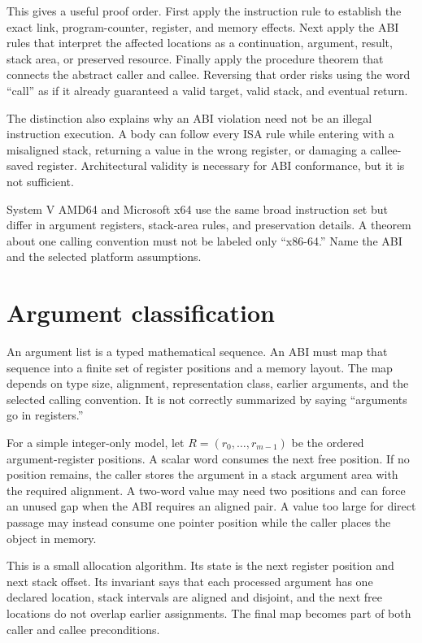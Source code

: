 This gives a useful proof order. First apply the instruction rule to establish
the exact link, program-counter, register, and memory effects. Next apply the
ABI rules that interpret the affected locations as a continuation, argument,
result, stack area, or preserved resource. Finally apply the procedure theorem
that connects the abstract caller and callee. Reversing that order risks using
the word ``call'' as if it already guaranteed a valid target, valid stack, and
eventual return.

The distinction also explains why an ABI violation need not be an illegal
instruction execution. A body can follow every ISA rule while entering with a
misaligned stack, returning a value in the wrong register, or damaging a
callee-saved register. Architectural validity is necessary for ABI
conformance, but it is not sufficient.

\begin{warning}[title={Name the x86-64 ABI, not merely the ISA}]
System V AMD64 and Microsoft x64 use the same broad instruction set but differ
in argument registers, stack-area rules, and preservation details. A theorem
about one calling convention must not be labeled only ``x86-64.'' Name the ABI
and the selected platform assumptions.
\end{warning}

\section{Argument classification}

An argument list is a typed mathematical sequence. An ABI must map that
sequence into a finite set of register positions and a memory layout. The map
depends on type size, alignment, representation class, earlier arguments, and
the selected calling convention. It is not correctly summarized by saying
``arguments go in registers.''

For a simple integer-only model, let \(R=(r_0,\ldots,r_{m-1})\) be the ordered
argument-register positions. A scalar word consumes the next free position. If
no position remains, the caller stores the argument in a stack argument area
with the required alignment. A two-word value may need two positions and can
force an unused gap when the ABI requires an aligned pair. A value too large
for direct passage may instead consume one pointer position while the caller
places the object in memory.

This is a small allocation algorithm. Its state is the next register position
and next stack offset. Its invariant says that each processed argument has one
declared location, stack intervals are aligned and disjoint, and the next free
locations do not overlap earlier assignments. The final map becomes part of
both caller and callee preconditions.

